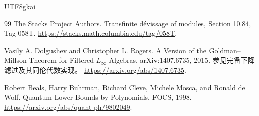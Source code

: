 \documentclass[12pt]{report}
\theoremstyle{definition}
\begin{document}
\begin{CJK*}{UTF8}{gkai}
\begin{thebibliography}{99}
 The Stacks Project Authors.
Transfinite d\'evissage of modules, Section 10.84, Tag 058T.
\newblock\url{https://stacks.math.columbia.edu/tag/058T}.

 Vasily A. Dolgushev and Christopher L. Rogers.
A Version of the Goldman--Millson Theorem for Filtered $L_\infty$ Algebras.
arXiv:1407.6735, 2015. 参见完备下降滤过及其同伦代数实现。
\newblock\url{https://arxiv.org/abs/1407.6735}.

 Robert Beals, Harry Buhrman, Richard Cleve, Michele Mosca, and Ronald de Wolf.
Quantum Lower Bounds by Polynomials. FOCS, 1998.
\newblock\url{https://arxiv.org/abs/quant-ph/9802049}.
\end{thebibliography}
\end{CJK*}
\end{document}
